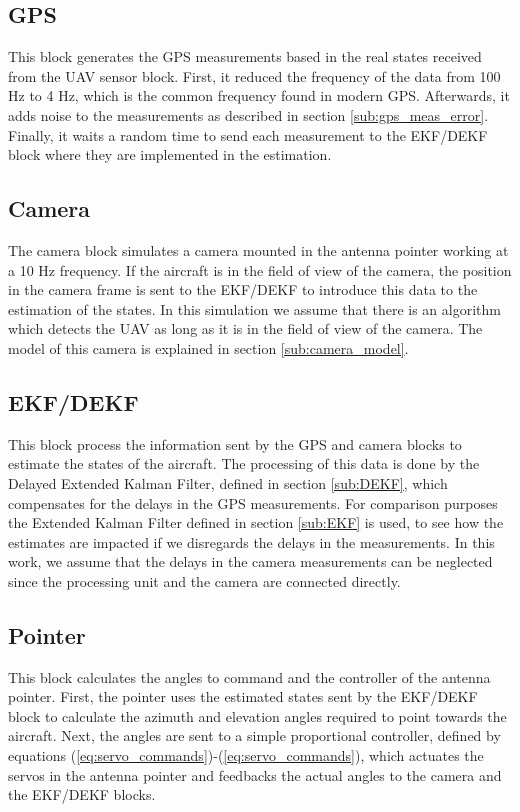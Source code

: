\subsection{GPS}
This block generates the GPS measurements based in the real states received from the UAV sensor block. First, it reduced the frequency of the data from 100 Hz to 4 Hz, which is the common frequency found in modern GPS. Afterwards, it adds noise to the measurements as described in section \ref{sub:gps_meas_error}. Finally, it waits a random time to send each measurement to the EKF/DEKF block where they are implemented in the estimation.
\pagebreak
\subsection{Camera}
The camera block simulates a camera mounted in the antenna pointer working at a 10 Hz frequency. If the aircraft is in the field of view of the camera, the position in the camera frame is sent to the EKF/DEKF to introduce this data to the estimation of the states. In this simulation we assume that there is an algorithm which detects the UAV as long as it is in the field of view of the camera. The model of this camera is explained in section \ref{sub:camera_model}.

\subsection{EKF/DEKF}
This block process the information sent by the GPS and camera blocks to estimate the states of the aircraft. The processing of this data is done by the Delayed Extended Kalman Filter, defined in section \ref{sub:DEKF}, which compensates for the delays in the GPS measurements. For comparison purposes the Extended Kalman Filter defined in section \ref{sub:EKF} is used, to see how the estimates are impacted if we disregards the delays in the measurements.
In this work, we assume that the delays in the camera measurements can be neglected since the processing unit and the camera are connected directly.  

\subsection{Pointer}
This block calculates the angles to command and the controller of the antenna pointer. First, the pointer uses the estimated states sent by the EKF/DEKF block to calculate the azimuth and elevation angles required to point towards the aircraft. Next, the angles are sent to a simple proportional controller, defined by equations (\ref{eq:servo_commands})-(\ref{eq:servo_commands}), which actuates the servos in the antenna pointer and feedbacks the actual angles to the camera and the EKF/DEKF blocks. 
\pagebreak
